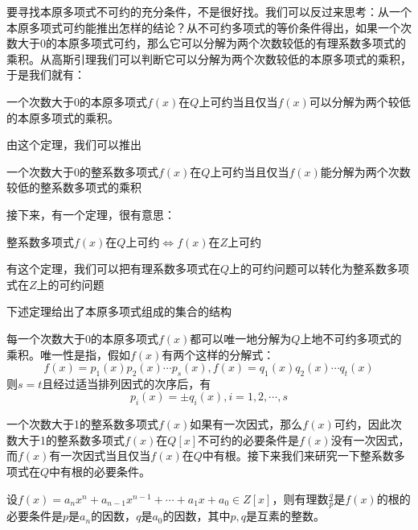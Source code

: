 \documentclass[lang=cn,10pt]{elegantbook}
\begin{document}
要寻找本原多项式不可约的充分条件，不是很好找。我们可以反过来思考：从一个本原多项式可约能推出怎样的结论？从不可约多项式的等价条件得出，如果一个次数大于0的本原多项式可约，那么它可以分解为两个次数较低的有理系数多项式的乘积。从高斯引理我们可以判断它可以分解为两个次数较低的本原多项式的乘积，于是我们就有：

\begin{theorem}
	一个次数大于0的本原多项式$f(x)$在$Q$上可约当且仅当$f(x)$可以分解为两个较低的本原多项式的乘积。
\end{theorem}
由这个定理，我们可以推出
\begin{corollary}
	一个次数大于0的整系数多项式$f(x)$在$Q$上可约当且仅当$f(x)$能分解为两个次数较低的整系数多项式的乘积
\end{corollary}

接下来，有一个定理，很有意思：
\begin{theorem}
	整系数多项式$f(x)$在$Q$上可约$\Leftrightarrow f(x)$在$Z$上可约
\end{theorem}

有这个定理，我们可以把有理系数多项式在$Q$上的可约问题可以转化为整系数多项式在$Z$上的可约问题

下述定理给出了本原多项式组成的集合的结构
\begin{theorem}
	每一个次数大于0的本原多项式$f(x)$都可以唯一地分解为$Q$上地不可约多项式的乘积。唯一性是指，假如$f(x)$有两个这样的分解式：
	\begin{equation*}
		f\left( x \right) =p_1\left( x \right) p_2\left( x \right) \cdots p_s\left( x \right) ,f\left( x \right) =q_1\left( x \right) q_2\left( x \right) \cdots q_t\left( x \right) 
	\end{equation*}
	则$s=t$且经过适当排列因式的次序后，有
	\begin{equation*}
		p_i\left( x \right) =\pm q_i\left( x \right) ,i=1,2,\cdots ,s
	\end{equation*}
\end{theorem}

一个次数大于1的整系数多项式$f(x)$如果有一次因式，那么$f(x)$可约，因此次数大于1的整系数多项式$f(x)$在$Q[x]$不可约的必要条件是$f(x)$没有一次因式，而$f(x)$有一次因式当且仅当$f(x)$在$Q$中有根。接下来我们来研究一下整系数多项式在$Q$中有根的必要条件。

\begin{theorem}
	设$f(x)=a_nx^n+a_{n-1}x^{n-1}+\cdots+a_1x+a_0\in Z[x]$，则有理数$\frac{q}{p}$是$f(x)$的根的必要条件是$p$是$a_n$的因数，$q$是$a_0$的因数，其中$p,q$是互素的整数。
\end{theorem}
\end{document}
